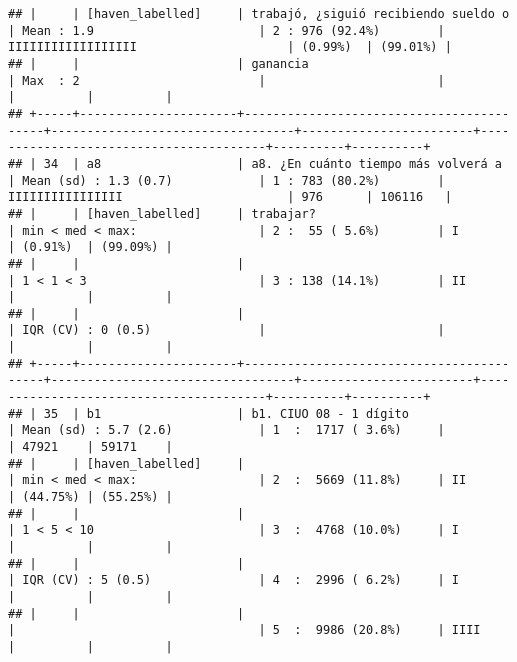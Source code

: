 \documentclass[]{article}
\begin{document}
\begin{verbatim}
## |     | [haven_labelled]     | trabajó, ¿siguió recibiendo sueldo o     | Mean : 1.9                       | 2 : 976 (92.4%)        | IIIIIIIIIIIIIIIIII                     | (0.99%)  | (99.01%) |
## |     |                      | ganancia                                 | Max  : 2                         |                        |                                        |          |          |
## +-----+----------------------+------------------------------------------+----------------------------------+------------------------+----------------------------------------+----------+----------+
## | 34  | a8                   | a8. ¿En cuánto tiempo más volverá a      | Mean (sd) : 1.3 (0.7)            | 1 : 783 (80.2%)        | IIIIIIIIIIIIIIII                       | 976      | 106116   |
## |     | [haven_labelled]     | trabajar?                                | min < med < max:                 | 2 :  55 ( 5.6%)        | I                                      | (0.91%)  | (99.09%) |
## |     |                      |                                          | 1 < 1 < 3                        | 3 : 138 (14.1%)        | II                                     |          |          |
## |     |                      |                                          | IQR (CV) : 0 (0.5)               |                        |                                        |          |          |
## +-----+----------------------+------------------------------------------+----------------------------------+------------------------+----------------------------------------+----------+----------+
## | 35  | b1                   | b1. CIUO 08 - 1 dígito                   | Mean (sd) : 5.7 (2.6)            | 1  :  1717 ( 3.6%)     |                                        | 47921    | 59171    |
## |     | [haven_labelled]     |                                          | min < med < max:                 | 2  :  5669 (11.8%)     | II                                     | (44.75%) | (55.25%) |
## |     |                      |                                          | 1 < 5 < 10                       | 3  :  4768 (10.0%)     | I                                      |          |          |
## |     |                      |                                          | IQR (CV) : 5 (0.5)               | 4  :  2996 ( 6.2%)     | I                                      |          |          |
## |     |                      |                                          |                                  | 5  :  9986 (20.8%)     | IIII                                   |          |          |

\end{verbatim}
\end{document}
